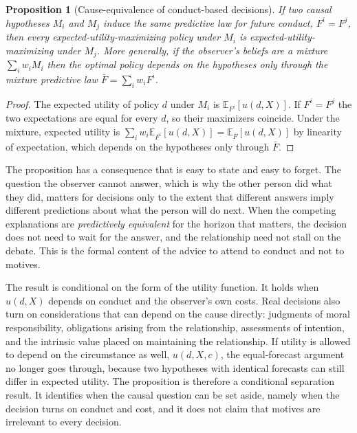 \documentclass[11pt]{article}
\newtheorem{proposition}{Proposition}
\theoremstyle{definition}
\theoremstyle{remark}
\begin{document}
\begin{proposition}[Cause-equivalence of conduct-based decisions]\label{prop:equivalence}
If two causal hypotheses $M_i$ and $M_j$ induce the same predictive law for future conduct, $F^{i}=F^{j}$, then every expected-utility-maximizing policy under $M_i$ is expected-utility-maximizing under $M_j$. More generally, if the observer's beliefs are a mixture $\sum_i w_i M_i$ then the optimal policy depends on the hypotheses only through the mixture predictive law $\bar F=\sum_i w_iF^{i}$.
\end{proposition}

\begin{proof}
The expected utility of policy $d$ under $M_i$ is $\mathbb{E}_{F^{i}}[u(d,X)]$. If $F^{i}=F^{j}$ the two expectations are equal for every $d$, so their maximizers coincide. Under the mixture, expected utility is $\sum_i w_i\mathbb{E}_{F^{i}}[u(d,X)]=\mathbb{E}_{\bar F}[u(d,X)]$ by linearity of expectation, which depends on the hypotheses only through $\bar F$.
\end{proof}

The proposition has a consequence that is easy to state and easy to forget. The question the observer cannot answer, which is why the other person did what they did, matters for decisions only to the extent that different answers imply different predictions about what the person will do next. When the competing explanations are \emph{predictively equivalent} for the horizon that matters, the decision does not need to wait for the answer, and the relationship need not stall on the debate. This is the formal content of the advice to attend to conduct and not to motives.

The result is conditional on the form of the utility function. It holds when $u(d,X)$ depends on conduct and the observer's own costs. Real decisions also turn on considerations that can depend on the cause directly: judgments of moral responsibility, obligations arising from the relationship, assessments of intention, and the intrinsic value placed on maintaining the relationship. If utility is allowed to depend on the circumstance as well, $u(d,X,c)$, the equal-forecast argument no longer goes through, because two hypotheses with identical forecasts can still differ in expected utility. The proposition is therefore a conditional separation result. It identifies when the causal question can be set aside, namely when the decision turns on conduct and cost, and it does not claim that motives are irrelevant to every decision.
\end{document}
